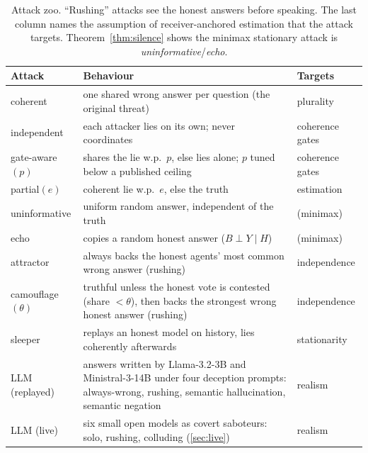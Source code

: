 \begin{table}[t]
\centering\small
\caption{Attack zoo. ``Rushing'' attacks see the honest answers before speaking. The last column names the assumption of receiver-anchored estimation that the attack targets. Theorem~\ref{thm:silence} shows the minimax stationary attack is \emph{uninformative}/\emph{echo}.}\label{tab:attacks}
\begin{tabular}{@{}p{3.1cm}p{8.3cm}p{2.5cm}@{}}
\toprule
Attack & Behaviour & Targets \\
\midrule
coherent & one shared wrong answer per question (the original threat) & plurality \\
independent & each attacker lies on its own; never coordinates & coherence gates \\
gate-aware$(p)$ & shares the lie w.p.\ $p$, else lies alone; $p$ tuned below a published ceiling & coherence gates \\
partial$(e)$ & coherent lie w.p.\ $e$, else the truth & estimation \\
uninformative & uniform random answer, independent of the truth & (minimax) \\
echo & copies a random honest answer ($B\perp Y\mid H$) & (minimax) \\
attractor & always backs the honest agents' most common wrong answer (rushing) & independence \\
camouflage$(\theta)$ & truthful unless the honest vote is contested (share $<\theta$), then backs the strongest wrong honest answer (rushing) & independence \\
sleeper & replays an honest model on history, lies coherently afterwards & stationarity \\
\midrule
LLM (replayed) & answers written by Llama-3.2-3B and Ministral-3-14B under four deception prompts: always-wrong, rushing, semantic hallucination, semantic negation & realism \\
LLM (live) & six small open models as covert saboteurs: solo, rushing, colluding (\cref{sec:live}) & realism \\
\bottomrule
\end{tabular}
\end{table}
